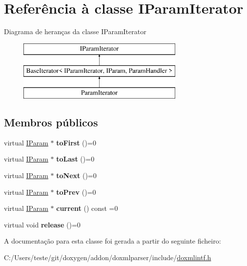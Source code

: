 \hypertarget{class_i_param_iterator}{\section{Referência à classe I\-Param\-Iterator}
\label{class_i_param_iterator}
}
Diagrama de heranças da classe I\-Param\-Iterator\begin{figure}[H]
\begin{center}
\leavevmode
\includegraphics[height=3.000000cm]{class_i_param_iterator}
\end{center}
\end{figure}
\subsection*{Membros públicos}
\begin{DoxyCompactItemize}
\item 
\hypertarget{class_i_param_iterator_a9b14cfd233966f6ec76dc80d342d7c01}{virtual \hyperlink{class_i_param}{I\-Param} $\ast$ {\bfseries to\-First} ()=0}\label{class_i_param_iterator_a9b14cfd233966f6ec76dc80d342d7c01}

\item 
\hypertarget{class_i_param_iterator_a710376089f3094b7ba7e7a2d23bb454f}{virtual \hyperlink{class_i_param}{I\-Param} $\ast$ {\bfseries to\-Last} ()=0}\label{class_i_param_iterator_a710376089f3094b7ba7e7a2d23bb454f}

\item 
\hypertarget{class_i_param_iterator_a9ff685223eebd37303dabfd92a7ac2bb}{virtual \hyperlink{class_i_param}{I\-Param} $\ast$ {\bfseries to\-Next} ()=0}\label{class_i_param_iterator_a9ff685223eebd37303dabfd92a7ac2bb}

\item 
\hypertarget{class_i_param_iterator_a010b7f2813a0971680de9549176027c8}{virtual \hyperlink{class_i_param}{I\-Param} $\ast$ {\bfseries to\-Prev} ()=0}\label{class_i_param_iterator_a010b7f2813a0971680de9549176027c8}

\item 
\hypertarget{class_i_param_iterator_a62d333e6c06050b5c0c36de5c3c4c5da}{virtual \hyperlink{class_i_param}{I\-Param} $\ast$ {\bfseries current} () const =0}\label{class_i_param_iterator_a62d333e6c06050b5c0c36de5c3c4c5da}

\item 
\hypertarget{class_i_param_iterator_aab0a52fdd148a54108e7bf49287d7c47}{virtual void {\bfseries release} ()=0}\label{class_i_param_iterator_aab0a52fdd148a54108e7bf49287d7c47}

\end{DoxyCompactItemize}


A documentação para esta classe foi gerada a partir do seguinte ficheiro\-:\begin{DoxyCompactItemize}
\item 
C\-:/\-Users/teste/git/doxygen/addon/doxmlparser/include/\hyperlink{include_2doxmlintf_8h}{doxmlintf.\-h}\end{DoxyCompactItemize}
